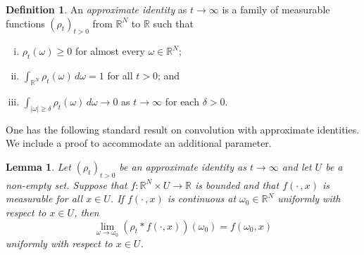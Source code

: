 \documentclass[a4paper, reqno]{amsart}
\numberwithin{equation}{section}
\theoremstyle{plain}
\newtheorem{lemma}[theorem]{Lemma}
\theoremstyle{definition}
\newtheorem{definition}[theorem]{Definition}
\theoremstyle{remark}
\newcommand{\RR}{\mathbb{R}}
\begin{document}
\begin{definition}
  \label{def:approx-id}
  An \emph{approximate identity} as $t \to \infty$ is a family of measurable functions $(\rho_t)_{t > 0}$ from $\RR^N$ to $\RR$ such that
  \begin{enumerate}[(i)]
  \item $\rho_t(\omega) \geq 0$ for almost every $\omega \in \RR^N$;
  \item $\int_{\RR^N} \rho_t(\omega)\,d\omega = 1$ for all $t > 0$; and
  \item $\int_{|\omega| \geq \delta} \rho_t(\omega)\,d\omega \to 0$ as $t \to \infty$ for each $\delta > 0$.
  \end{enumerate}
\end{definition}
One has the following standard result on convolution with approximate identities. We include a proof to accommodate an additional parameter.
\begin{lemma}
  \label{lem:approx-id}
  Let $(\rho_t)_{t > 0}$ be an approximate identity as $t \to \infty$ and let $U$ be a non-empty set. Suppose that $f\colon\RR^N\times U\to\RR$ is bounded and that $f(\cdot\,,x)$ is measurable for all $x\in U$. If $f(\cdot\,,x)$ is continuous at $\omega_0\in\RR^N$ uniformly with respect to $x\in U$, then
  \begin{equation*}
    \lim_{\omega\to \omega_0}(\rho_t * f(\cdot,x))(\omega_0)
    =f(\omega_0,x)
  \end{equation*}
  uniformly with respect to $x\in U$.
\end{lemma}
\end{document}
